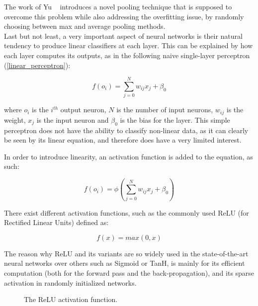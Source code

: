 The work of Yu \etal~\cite{MixedPooling} introduces a novel pooling
technique that is supposed to overcome this problem while also addressing the
overfitting issue, by randomly choosing between max and average pooling
methods.\\

Last but not least, a very important aspect of neural networks is their
natural tendency to produce linear classifiers at each layer. This can be
explained by how each layer computes its outputs, as in the following naive
single-layer perceptron (\ref{linear_perceptron}):

\begin{equation} \label{linear_perceptron}
	f(o_i) = \displaystyle\sum_{j=0}^{N} w_{ij}x_j+\beta_0
\end{equation}


where $o_i$ is the $i^{th}$ output neuron, $N$ is the number of input neurons,
$w_{ij}$ is the weight, $x_j$ is the input neuron and $\beta_0$ is the bias for
the layer. This simple perceptron does not have the ability to classify
non-linear data, as it can clearly be seen by its linear equation, and
therefore does have a very limited interest.

In order to introduce linearity, an activation function is added to the
equation, as such:

\begin{equation} \label{nonlinear_perceptron}
	f(o_i) = \phi(\displaystyle\sum_{j=0}^{N} w_{ij}x_j+\beta_0)
\end{equation}

There exist different activation functions, such as the commonly used ReLU (for
Rectified Linear Units) defined as:

\begin{equation} \label{relu}
	f(x) = max(0, x)
\end{equation}

The reason why ReLU and its variants are so widely used in the state-of-the-art
neural networks over others such as Sigmoid or TanH, is mainly for its
efficient computation (both for the forward pass and the back-propagation), and
its sparse activation in randomly initialized networks.

\begin{figure}[h]
	\centering
	\caption{The ReLU activation function.}
\end{figure}

